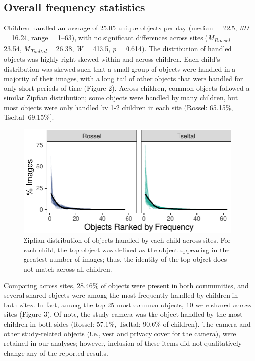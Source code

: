 \documentclass[10pt, letterpaper]{article}
\newenvironment{CodeChunk}{}{}
\begin{document}
\hypertarget{overall-frequency-statistics}{%
\subsection{Overall frequency
statistics}\label{overall-frequency-statistics}}

Children handled an average of 25.05 unique objects per day (median =
22.5, \emph{SD} = 16.24, range = 1--63), with no significant differences
across sites (\emph{M}\textsubscript{\emph{Rossel}} = 23.54,
\emph{M}\textsubscript{\emph{Tseltal}} = 26.38, \emph{W} = 413.5,
\emph{p} = 0.614). The distribution of handled objects was highly
right-skewed within and across children. Each child's distribution was
skewed such that a small group of objects were handled in a majority of
their images, with a long tail of other objects that were handled for
only short periods of time (Figure 2). Across children, common objects
followed a similar Zipfian distribution; some objects were handled by
many children, but most objects were only handled by 1-2 children in
each site (Rossel: 65.15\%, Tseltal: 69.15\%).

\begin{CodeChunk}
\begin{figure}[h]

{\centering \includegraphics{figs/zipfian-objects-fig-1} 

}

\caption[Zipfian distribution of objects handled by each child across sites]{Zipfian distribution of objects handled by each child across sites. For each child, the top object was defined as the object appearing in the greatest number of images; thus, the identity of the top object does not match across all children.}\label{fig:zipfian-objects-fig}
\end{figure}
\end{CodeChunk}

Comparing across sites, 28.46\% of objects were present in both
communities, and several shared objects were among the most frequently
handled by children in both sites. In fact, among the top 25 most common
objects, 10 were shared across sites (Figure 3). Of note, the study
camera was the object handled by the most children in both sides
(Rossel: 57.1\%, Tseltal: 90.6\% of children). The camera and other
study-related objects (i.e., vest and privacy cover for the camera),
were retained in our analyses; however, inclusion of these items did not
qualitatively change any of the reported results.
\end{document}
